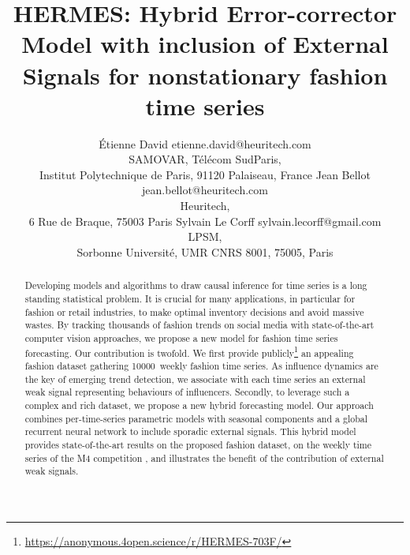 \documentclass[10pt]{article} %
\title{HERMES: Hybrid Error-corrector Model with inclusion of External Signals for nonstationary fashion time series}
\author{\name \'Etienne David \email etienne.david@heuritech.com \\
      \addr SAMOVAR, Télécom SudParis,\\
      Institut Polytechnique de Paris, 91120 Palaiseau, France
      \AND
      \name Jean Bellot \email jean.bellot@heuritech.com \\
      \addr Heuritech, \\
      6 Rue de Braque, 75003 Paris
      \AND
      \name Sylvain Le Corff \email sylvain.lecorff@gmail.com\\
      \addr LPSM, \\
      Sorbonne Université, UMR CNRS 8001, 75005, Paris
      }
\newcommand{\numberts}{10000}
\begin{document}
\maketitle

\begin{abstract}
Developing models and algorithms to draw causal inference for time series is a long standing statistical problem. It is crucial for many applications, in particular for fashion or retail industries, to make optimal inventory decisions and avoid massive wastes. By tracking thousands of fashion trends on social media with state-of-the-art computer vision approaches, we propose a new model for fashion time series forecasting. Our contribution is  twofold. We first provide publicly\footnote[1]{\url{https://anonymous.4open.science/r/HERMES-703F/}} an appealing fashion dataset gathering \numberts\ weekly fashion time series. As influence dynamics are the key of emerging trend detection, we associate with each time series an external weak signal representing behaviours of influencers. Secondly, to leverage such a complex and rich dataset, we propose a new hybrid forecasting model\footnotemark. Our approach combines per-time-series parametric models with seasonal components and a global recurrent neural network to include sporadic external signals. This hybrid model provides state-of-the-art results on the proposed fashion dataset, on the weekly time series of the M4 competition \citep{makridakis2018}, and illustrates the benefit of the contribution of external weak signals.
\end{abstract}
\end{document}
